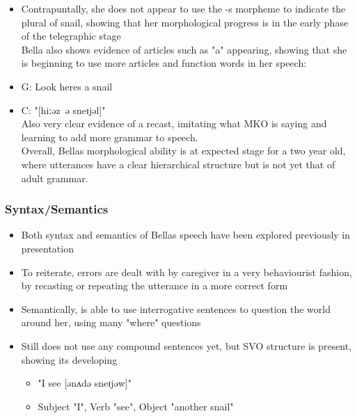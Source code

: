 \documentclass[
]{article}
\providecommand{\tightlist}{%
  \setlength{\itemsep}{0pt}\setlength{\parskip}{0pt}}
\begin{document}
\begin{itemize}
\tightlist
\item
  Contrapuntally, she does not appear to use the -s morpheme to indicate
  the plural of snail, showing that her morphological progress is in the
  early phase of the telegraphic stage\\
  Bella also shows evidence of articles such as "a" appearing, showing
  that she is beginning to use more articles and function words in her
  speech:
\item
  G: Look here\textquotesingle s a snail
\item
  C: "{[}hiːəz~ə sneɪjəl{]}"\\
  Also very clear evidence of a recast, imitating what MKO is saying and
  learning to add more grammar to speech.\\
  Overall, Bella\textquotesingle s morphological ability is at expected
  stage for a two year old, where utterances have a clear hierarchical
  structure but is not yet that of adult grammar.
\end{itemize}

\hypertarget{syntaxsemantics}{%
\subsubsection{Syntax/Semantics}\label{syntaxsemantics}}

\begin{itemize}
\tightlist
\item
  Both syntax and semantics of Bella\textquotesingle s speech have been
  explored previously in presentation
\item
  To reiterate, errors are dealt with by caregiver in a very
  behaviourist fashion, by recasting or repeating the utterance in a
  more correct form
\item
  Semantically, is able to use interrogative sentences to question the
  world around her, using many "where" questions
\item
  Still does not use any compound sentences yet, but SVO structure is
  present, showing it\textquotesingle s developing

  \begin{itemize}
  \tightlist
  \item
    "I see {[}ənʌdə sneɪjəw{]}"
  \item
    Subject "I", Verb "see", Object "another snail"
  \end{itemize}
\end{itemize}
\end{document}
